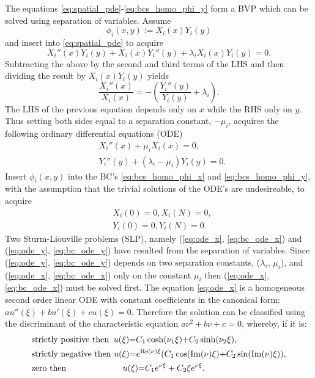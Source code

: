 \documentclass[\main/thesis.tex]{subfiles}
\begin{document}
The equations \eqref{eq:spatial_pde}-\eqref{eq:bcs_homo_phi_y} form a BVP which can be solved using separation of variables. Assume
\begin{equation*}
\phi_i(x, y) {:=} X_i(x)Y_i(y)
\end{equation*}
and insert into 
\eqref{eq:spatial_pde} to acquire
\begin{equation*}
X_i''(x)Y_i(y) {+} X_i(x)Y_i''(y) {+} \lambda_i X_i(x)Y_i(y) {=} 0.
\end{equation*} 
Subtracting the above by the second and third terms of the LHS and then dividing the result by $X_i(x)Y_i(y)$ yields
\begin{equation*}
\frac{X_i''(x)}{X_i(x)} {=} {-}\left(\frac{Y_i''(y)}{Y_i(y)} {+} \lambda_i \right).
\end{equation*}
The LHS of the previous equation depends only on $x$ while the RHS only on $y$. Thus setting both sides equal to a separation constant, $\minus \mu_i$, acquires the following ordinary 
differential equations (ODE)
\begin{align}
&X_i''(x) {+} \mu_i X_i(x) {=} 0,
\label{eq:ode_x} \\
&Y_i''(y) {+} (\lambda_i {-} \mu_i)Y_i(y) {=} 0.
\label{eq:ode_y}
\end{align}
Insert $\phi_i(x, y)$ into the BC's \eqref{eq:bcs_homo_phi_x} and \eqref{eq:bcs_homo_phi_y}, with the assumption that the trivial solutions of the ODE's are undesireable, to acquire
\begin{align}
&X_i(0) {=} 0, X_i(N) {=} 0,
\label{eq:bc_ode_x}\\
&Y_i(0) {=} 0, Y_i(N) {=} 0.
\label{eq:bc_ode_y}
\end{align} 
Two Sturm-Liouville problems (SLP), namely (\ref{eq:ode_x}, \ref{eq:bc_ode_x}) and (\ref{eq:ode_y}, \ref{eq:bc_ode_y}) have resulted from the separation of variables.
Since (\ref{eq:ode_y}, \ref{eq:bc_ode_y}) depends on two separation constants, ($\lambda_i$, $\mu_i$), and (\ref{eq:ode_x}, \ref{eq:bc_ode_x}) only on the constant $\mu_i$ then
(\ref{eq:ode_x}, \ref{eq:bc_ode_x}) must be solved first. The equation \eqref{eq:ode_x} is a homogeneous second order linear ODE with constant coefficients in the canonical form:
$au''(\xi) {+} bu'(\xi) {+} cu(\xi) {=} 0$. Therefore the solution can be classified using the discriminant of the characteristic equation $a\nu^2 {+} b\nu {+} c {=} 0$, whereby, if it is:
\begin{align*}
&\text{strictly positive then } \hspace{0.03in}u(\xi) {=} C_1\cosh(\nu_1\xi) {+} C_2\sinh(\nu_2\xi),\\
&\text{strictly negative then } u(\xi) {=} e^{\text{Re}(\nu) \xi}(C_1\cos(\text{Im}(\nu) \xi) {+} C_2\sin(\text{Im}(\nu) \xi)),\\
&\text{zero then } \hspace{0.87in}u(\xi) {=} C_1 e^{\nu \xi} + C_2\xi e^{\nu \xi}.
\end{align*}
\end{document}
